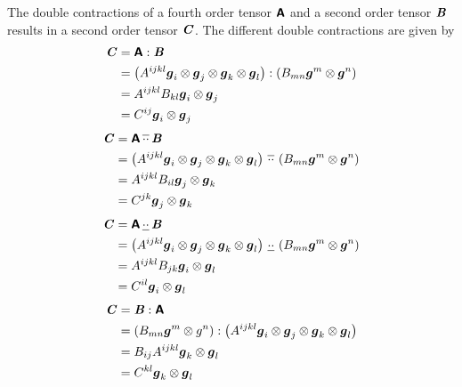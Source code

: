 The double contractions of a fourth order tensor $\boldsymbol{\mathsf{A}}$ and a second
order tensor $\boldsymbol{\mathit{B}}$ results in a second order tensor
$\boldsymbol{\mathit{C}}$. The different double contractions are given by
\begin{equation}
  \begin{aligned}
    \boldsymbol{\mathit{C}}&= \boldsymbol{\mathsf{A}} : \boldsymbol{\mathit{B}} \\
    &= \left( A^{ijkl} \boldsymbol{g}_{i} \otimes \boldsymbol{g}_{j} \otimes \boldsymbol{g}_{k} \otimes \boldsymbol{g}_{l}  \right) : \left( B_{mn} \boldsymbol{g}^{m} \otimes \boldsymbol{g}^{n}  \right) \\
    &=A^{ijkl}B_{kl} \boldsymbol{g}_{i} \otimes \boldsymbol{g}_{j} \\
    &=C^{ij} \boldsymbol{g}_{i} \otimes \boldsymbol{g}_{j}               
  \end{aligned}
\end{equation}
\begin{equation}
  \begin{aligned}
    \boldsymbol{\mathit{C}}&= \boldsymbol{\mathsf{A}} \, \overline{\cdot\cdot} \, \boldsymbol{\mathit{B}} \\
    &= \left( A^{ijkl} \boldsymbol{g}_{i} \otimes \boldsymbol{g}_{j} \otimes \boldsymbol{g}_{k} \otimes \boldsymbol{g}_{l}  \right) \, \overline{\cdot\cdot} \, \left( B_{mn} \boldsymbol{g}^{m} \otimes \boldsymbol{g}^{n}  \right) \\
    &=A^{ijkl}B_{il} \boldsymbol{g}_{j} \otimes \boldsymbol{g}_{k} \\
    &=C^{jk} \boldsymbol{g}_{j} \otimes \boldsymbol{g}_{k}               
  \end{aligned}
\end{equation}
\begin{equation}
  \begin{aligned}
    \boldsymbol{\mathit{C}}&= \boldsymbol{\mathsf{A}} \, \underline{\cdot\cdot} \, \boldsymbol{\mathit{B}} \\
    &= \left( A^{ijkl} \boldsymbol{g}_{i} \otimes \boldsymbol{g}_{j} \otimes \boldsymbol{g}_{k} \otimes \boldsymbol{g}_{l}  \right) \, \underline{\cdot\cdot} \, \left( B_{mn} \boldsymbol{g}^{m} \otimes \boldsymbol{g}^{n}  \right) \\
    &=A^{ijkl}B_{jk} \boldsymbol{g}_{i} \otimes \boldsymbol{g}_{l} \\
    &=C^{il} \boldsymbol{g}_{i} \otimes \boldsymbol{g}_{l}               
  \end{aligned}
\end{equation}
\begin{equation}
  \begin{aligned}
    \boldsymbol{\mathit{C}}&= \boldsymbol{\mathit{B}} : \boldsymbol{\mathsf{A}} \\
    &= \left( B_{mn} \boldsymbol{g}^{m} \otimes  g^{n}  \right) : \left( A^{ijkl} \boldsymbol{g}_{i} \otimes \boldsymbol{g}_{j} \otimes \boldsymbol{g}_{k} \otimes \boldsymbol{g}_{l}  \right) \\
    &=B_{ij}A^{ijkl} \boldsymbol{g}_{k} \otimes \boldsymbol{g}_{l} \\
    &=C^{kl} \boldsymbol{g}_{k} \otimes \boldsymbol{g}_{l}               
  \end{aligned}
\end{equation}
